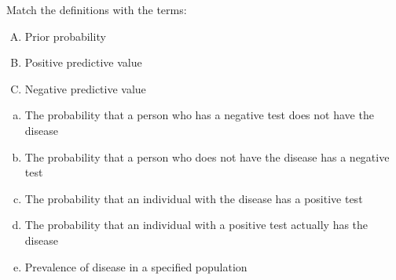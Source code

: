  
Match the definitions with the terms:

\begin{enumerate}[A.]
\item Prior probability
\item Positive predictive value
\item Negative predictive value
\end{enumerate}

\begin{enumerate}[(a)]
\item The probability that a person who has a negative test does not
  have the disease 
\item The probability that a person who does not have the disease has
 a negative test 
\item The probability that an individual with the disease has a
 positive test 
\item The probability that an individual with a positive test actually
  has the disease 
\item Prevalence of disease in a specified population 
\end{enumerate}